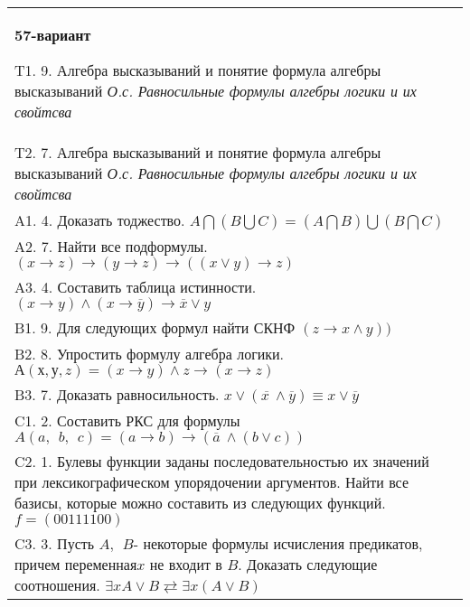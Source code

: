 \documentclass{article}
\begin{document}
\begin{tabular}{m{17cm}}
\textbf{57-вариант}
\newline

T1. 9. Алгебра высказываний и понятие формула алгебры высказываний \emph{О.с. Равносильные формулы алгебры логики и их свойтсва} \\
T2. 7. Алгебра высказываний и понятие формула алгебры высказываний \emph{О.с. Равносильные формулы алгебры логики и их свойтсва} \\
A1. 4. Доказать тоджество. \(A\bigcap(B\bigcup C) = (A\bigcap B)\bigcup(B\bigcap C)\) \\
A2. 7. Найти все подформулы. \((x \rightarrow z) \rightarrow (y \rightarrow z) \rightarrow ((x \vee y) \rightarrow z)\) \\
A3. 4. Составить таблица истинности. \((x \rightarrow y) \land (x \rightarrow \overline{y}) \rightarrow \overline{x} \vee y\) \\
B1. 9. Для следующих формул найти СКНФ \((z \rightarrow x \land y))\) \\
B2. 8. Упростить формулу алгебра логики. \(А(х,у,z) = (x \rightarrow y) \land z \rightarrow (x \rightarrow z)\) \\
B3. 7. Доказать равносильность. \(x \vee \left( \overline{x\ } \land \overline{y} \right) \equiv x \vee \overline{y}\) \\
C1. 2. Составить РКС для формулы \(A(a,\ \ b,\ \ c) = (a \rightarrow b) \rightarrow (\overline{a}\  \land (b \vee c))\) \\
C2. 1. Булевы функции заданы последовательностью их значений при лексикографическом упорядочении аргументов. Найти все базисы, которые можно составить из следующих функций.\(f = (00111100)\) \\
C3. 3. Пусть \(A,\ \ B\)- некоторые формулы исчисления предикатов, причем переменная\(x\) не входит в \(B\). Доказать следующие соотношения. \(\exists xA \vee B \rightleftarrows \exists x(A \vee B)\) \\

\end{tabular}
\vspace{1cm}
\end{document}
